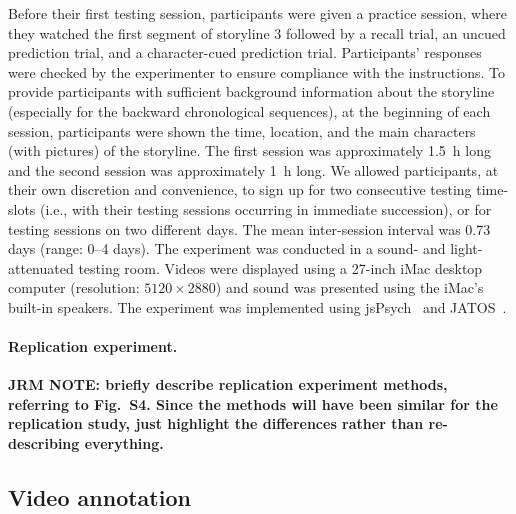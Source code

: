 \documentclass[10pt]{article}
\newcommand{\MethodsReplExp}{S4}
\begin{document}
Before their first testing session, participants were given a practice session,
where they watched the first segment of storyline 3 followed by a recall trial,
an uncued prediction trial, and a character-cued prediction trial.
Participants' responses were checked by the experimenter to ensure compliance
with the instructions. To provide participants with sufficient background
information about the storyline (especially for the backward chronological
sequences), at the beginning of each session, participants were shown the time,
location, and the main characters (with pictures) of the storyline. The first
session was approximately 1.5~h long and the second session was approximately
1~h long. We allowed participants, at their own discretion and convenience, to
sign up for two consecutive testing time-slots (i.e., with their testing
sessions occurring in immediate succession), or for testing sessions on two
different days. The mean inter-session interval was 0.73 days (range: 0--4
days). The experiment was conducted in a sound- and light-attenuated testing
room. Videos were displayed using a 27-inch iMac desktop computer (resolution:
$5120 \times 2880$) and sound was presented using the iMac’s built-in speakers.
The experiment was implemented using jsPsych~\citep{deLe15} and
JATOS~\citep{LangEtal15}.

\paragraph{Replication experiment.} \textbf{JRM NOTE: briefly describe
replication experiment methods, referring to Fig.~\MethodsReplExp. Since the
methods will have been similar for the replication study, just highlight the
differences rather than re-describing everything.}

\subsection*{Video annotation}
\end{document}
